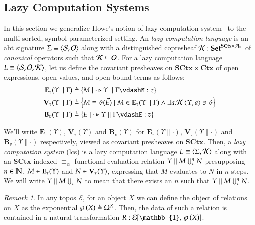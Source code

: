 \documentclass[11pt]{article}
\theoremstyle{definition}
\theoremstyle{remark}
\newtheorem{remark}[thm]{Remark}
\numberwithin{equation}{section}
\def\IModeColorName{MidnightBlue}
\def\OModeColorName{Maroon}
\def\IModeColorName{Black}
\def\OModeColorName{Black}
\newcommand\IMode[1]{{\color{\IModeColorName}{#1}}}
\newcommand\OMode[1]{{\color{\OModeColorName}{#1}}}
\newcommand\MkSet[1]{\left\{#1\right\}}
\newcommand\Member[2]{\IMode{#1}\in\IMode{#2}}
\newcommand\Of[2]{\IMode{#1}: \IMode{#2}}
\newcommand\Match[2]{\IMode{#1}\equiv\OMode{#2}}
\newcommand\Sorts{\mathcal{S}}
\newcommand\Arities{\mathcal{A}}
\newcommand\Operators{\mathcal{O}}
\newcommand\CanOperators{\mathcal{K}}
\newcommand\Discrete[1]{#1_{\equiv}}
\newcommand\Sets{\mathbf{Set}}
\newcommand\SCtx{\mathbf{SCtx}}
\newcommand\Ctx{\mathbf{Ctx}}
\newcommand\Pair[2]{\left\langle#1, #2 \right\rangle}
\newcommand\Tuple[1]{\left\langle#1 \right\rangle}
\newcommand\IsAbtUnmoded[5]{
  #1\triangleright%
  #2\parallel%
  #3\vdash%
  #4:\OMode{#5}%
}
\newcommand\App[2]{#1(#2)}
\newcommand\Hom[3]{#1\!\left[#2,\,#3\right]}
\newcommand\IsSubsetEq[2]{\IMode{#1}\subseteq\IMode{#2}}
\newcommand\Define[2]{\IMode{#1}\triangleq\OMode{#2}}
\newcommand\ADefine[2]{\IMode{#1}&\triangleq\OMode{#2}}
\newcommand\Pow[1]{\wp\left(#1\right)}
\newcommand\EvalN[5]{\IMode{#1}\parallel\IMode{#4}\Downarrow^{\OMode{#3}}_{\IMode{#2}}\OMode{#5}}
\newcommand\Eval[4]{\EvalN{#1}{#2}{}{#3}{#4}}
\newcommand\Exprs{\mathbf{E}}
\newcommand\Values{\mathbf{V}}
\newcommand\BTms{\mathbf{B}}
\newcommand\Naturals{\mathbb{N}}
\begin{document}
\subsection{Lazy Computation Systems}

In this section we generalize Howe's notion of lazy computation
system~\cite{howe:1989} to the multi-sorted, symbol-parameterized setting. An
\emph{lazy computation language} is an abt signature
$\Match{\Sigma}{\Pair{\Sorts}{\Operators}}$ along with a distinguished
copresheaf $\Of{\CanOperators}{\Sets^{\SCtx\times\Discrete{\Arities}}}$ of
\emph{canonical} operators such that $\IsSubsetEq{\CanOperators}{\Operators}$.
For a lazy computation language
$\Match{L}{\Tuple{\Sorts,\Operators,\CanOperators}}$, let us define the
covariant presheaves on $\SCtx\times\Ctx$ of open expressions, open values, and open bound terms
as follows:
\begin{align*}
  \ADefine{\Exprs_\tau(\Upsilon\parallel\Gamma)}{
    \MkSet{M \mid \IsAbtUnmoded{\cdot}{\Upsilon}{\Gamma}{M}{\tau}}
  }\\
  \ADefine{\Values_\tau(\Upsilon\parallel\Gamma)}{
    \MkSet{
      M\equiv\App{\vartheta}{\vec{E}}
      \mid M\in\Exprs_\tau(\Upsilon\parallel\Gamma)\land \exists a. \CanOperators\Pair{\Upsilon}{a}\ni\vartheta
    }
  }\\
  \ADefine{
    \BTms_{v}(\Upsilon\parallel\Gamma)
  }{
    \MkSet{E \mid \IsAbtUnmoded{\cdot}{\Upsilon}{\Gamma}{E}{v}}
  }
\end{align*}

We'll write $\Exprs_\tau(\Upsilon)$, $\Values_\tau(\Upsilon)$ and
$\BTms_v(\Upsilon)$ for $\Exprs_\tau(\Upsilon\parallel\cdot)$,
$\Values_\tau(\Upsilon\parallel\cdot)$ and $\BTms_v(\Upsilon\parallel\cdot)$
respectively, viewed as covariant presheaves on $\SCtx$. Then, a \emph{lazy
computation system} (lcs) is a lazy computation language
$\Match{L}{\Pair{\Sigma}{\CanOperators}}$ along with an $\SCtx$-indexed
$\equiv_\alpha$-functional evaluation relation
$\EvalN{\Upsilon}{\tau}{n}{M}{N}$ presupposing $\Member{n}{\Naturals}$,
$\Member{M}{\Exprs_\tau(\Upsilon)}$ and $\Member{N}{\Values_\tau(\Upsilon)}$,
expressing that $M$ evaluates to $N$ in $n$ steps.  We will write
$\Eval{\Upsilon}{\tau}{M}{N}$ to mean that there exists an $n$ such that
$\EvalN{\Upsilon}{\tau}{n}{M}{N}$.

\begin{remark}
  In any topos $\mathcal{E}$, for an object $X$ we can define the object of
  relations on $X$ as the exponential $\Define{\Pow{X}}{\Omega^X}$. Then, the
  data of such a relation is contained in a natural transformation
  $\Of{R}{\Hom{\mathcal{E}}{\mathbb{1}}{\Pow{X}}}$.
\end{remark}
\end{document}

